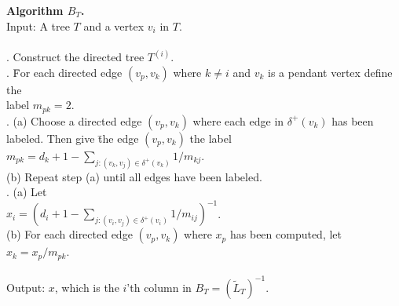 \documentclass[12pt]{article}
\begin{document}
\bigskip\bigskip\bigskip
{\small
\begin{tabbing}
{\bf Algor}\={\bf ithm $B_T$.} \\
Input: A tree $T$ and a vertex $v_i$ in $T$. 
\\
\\

 . Construct the directed tree $T^{(i)}$.\\
 . \=For each directed edge $(v_p,v_k)$ where $k\not =i$ and $v_k$ is a pendant vertex define the \\
   \>\>label $m_{pk}=2$. \\
 . \>(a) Choose a directed edge $(v_p,v_k)$ where each edge in $\delta^+(v_k)$ has been \\
 \>\>labeled. Then give \=the edge $(v_p,v_k)$ the label \\
 \>\> \>         $m_{pk}=d_k+1-\sum_{j:(v_k,v_j)\in \delta^+(v_k)} 1/m_{kj}$. \\
 \>\>(b) Repeat step (a) until all edges have been labeled.  \\ 
. (a) Let \\
\>\>\> $x_i=(d_i+1-\sum_{j:(v_i,v_j)\in \delta^+(v_i)} 1/m_{ij})^{-1}$. \\
\>\>(b) For  each directed edge $(v_p,v_k)$ where $x_p$ has been computed, let \\
\>\>\> $x_k=x_p/m_{pk}$.   \\

\\
Output: $x$, which is the $i$'th column  in $B_T=(\tilde{L}_T)^{-1}$. 
\end{tabbing}
}
\end{document}
